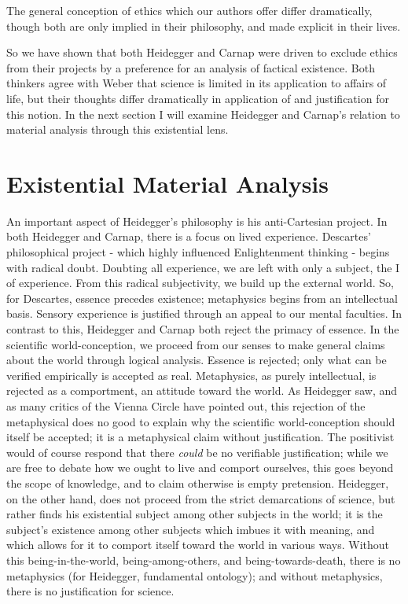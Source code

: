\documentclass[leqno, 12pt]{turabian-researchpaper}
\begin{document}
	The general conception of ethics which our authors offer differ dramatically, though
	both are only implied in their philosophy, and made explicit in their lives.

	So we have shown that both Heidegger and Carnap were driven to exclude ethics
	from their projects by a preference for an analysis of factical existence. Both
	thinkers agree with Weber that science is limited in its application to affairs
	of life, but their thoughts differ dramatically in application of and
	justification for this notion. In the next section I will examine Heidegger and
	Carnap's relation to material analysis through this existential lens.

	\section{Existential Material Analysis}

	An important aspect of Heidegger's philosophy is his anti-Cartesian project. In
	both Heidegger and Carnap, there is a focus on lived experience. Descartes'
	philosophical project - which highly influenced Enlightenment thinking -
	begins with radical doubt. Doubting all experience, we are left with only a
	subject, the I of experience. From this radical subjectivity, we build up the external
	world. So, for Descartes, essence precedes existence; metaphysics begins from an
	intellectual basis. Sensory experience is justified through an appeal to our
	mental faculties. In contrast to this, Heidegger and Carnap both reject the
	primacy of essence. In the scientific world-conception, we proceed from our
	senses to make general claims about the world through logical analysis. Essence
	is rejected; only what can be verified empirically is accepted as real. Metaphysics,
	as purely intellectual, is rejected as a comportment, an attitude toward the
	world. As Heidegger saw, and as many critics of the Vienna Circle have pointed
	out, this rejection of the metaphysical does no good to explain why the scientific
	world-conception should itself be accepted; it is a metaphysical claim without
	justification. The positivist would of course respond that there \emph{could}
	be no verifiable justification; while we are free to debate how we ought to live
	and comport ourselves, this goes beyond the scope of knowledge, and to claim otherwise
	is empty pretension. Heidegger, on the other hand, does not proceed from the
	strict demarcations of science, but rather finds his existential subject among
	other subjects in the world; it is the subject's existence among other
	subjects which imbues it with meaning, and which allows for it to comport itself
	toward the world in various ways. Without this being-in-the-world, being-among-others,
	and being-towards-death, there is no metaphysics (for Heidegger, fundamental ontology);
	and without metaphysics, there is no justification for science.
\end{document}
